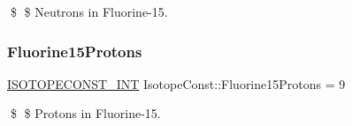 \$ \$ Neutrons in Fluorine-\/15. \mbox{\label{group___isotope_const-_fluorine-_f15_gabbcd6372dadc15de97d7b5866b74b21e}} 
\subsubsection{\texorpdfstring{Fluorine15\+Protons}{Fluorine15Protons}}
{\footnotesize\ttfamily \mbox{\hyperlink{group___isotope_const-_macros_ga5f18360b3e99483a35c32d789e62621c}{I\+S\+O\+T\+O\+P\+E\+C\+O\+N\+S\+T\+\_\+\+I\+NT}} Isotope\+Const\+::\+Fluorine15\+Protons = 9}

\$ \$ Protons in Fluorine-\/15. 